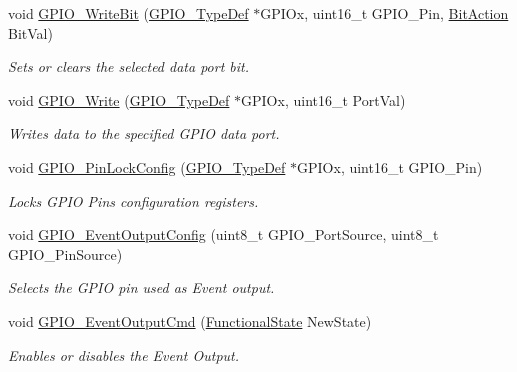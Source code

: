 \begin{DoxyCompactItemize}
void \hyperlink{group___g_p_i_o___private___functions_ga8f7b237fd744d9f7456fbe0da47a9b80}{G\+P\+I\+O\+\_\+\+Write\+Bit} (\hyperlink{struct_g_p_i_o___type_def}{G\+P\+I\+O\+\_\+\+Type\+Def} $\ast$G\+P\+I\+Ox, uint16\+\_\+t G\+P\+I\+O\+\_\+\+Pin, \hyperlink{group___g_p_i_o___exported___types_ga176130b21c0e719121470a6042d4cf19}{Bit\+Action} Bit\+Val)
\begin{DoxyCompactList}\small\item\em Sets or clears the selected data port bit. \end{DoxyCompactList}\item 
void \hyperlink{group___g_p_i_o___private___functions_gaa925f19c8547a00c7a0c269a84873bf9}{G\+P\+I\+O\+\_\+\+Write} (\hyperlink{struct_g_p_i_o___type_def}{G\+P\+I\+O\+\_\+\+Type\+Def} $\ast$G\+P\+I\+Ox, uint16\+\_\+t Port\+Val)
\begin{DoxyCompactList}\small\item\em Writes data to the specified G\+P\+IO data port. \end{DoxyCompactList}\item 
void \hyperlink{group___g_p_i_o___private___functions_gad2f2e615928c69fd0d8c641a7cedaafc}{G\+P\+I\+O\+\_\+\+Pin\+Lock\+Config} (\hyperlink{struct_g_p_i_o___type_def}{G\+P\+I\+O\+\_\+\+Type\+Def} $\ast$G\+P\+I\+Ox, uint16\+\_\+t G\+P\+I\+O\+\_\+\+Pin)
\begin{DoxyCompactList}\small\item\em Locks G\+P\+IO Pins configuration registers. \end{DoxyCompactList}\item 
void \hyperlink{group___g_p_i_o___private___functions_ga935f31ed7a86c6cb594cf34313b4b7af}{G\+P\+I\+O\+\_\+\+Event\+Output\+Config} (uint8\+\_\+t G\+P\+I\+O\+\_\+\+Port\+Source, uint8\+\_\+t G\+P\+I\+O\+\_\+\+Pin\+Source)
\begin{DoxyCompactList}\small\item\em Selects the G\+P\+IO pin used as Event output. \end{DoxyCompactList}\item 
void \hyperlink{group___g_p_i_o___private___functions_gaf13ab3d59e467df44b492f1cdfe2f588}{G\+P\+I\+O\+\_\+\+Event\+Output\+Cmd} (\hyperlink{group___exported__types_gac9a7e9a35d2513ec15c3b537aaa4fba1}{Functional\+State} New\+State)
\begin{DoxyCompactList}\small\item\em Enables or disables the Event Output. \end{DoxyCompactList}\item 

\end{DoxyCompactItemize}
